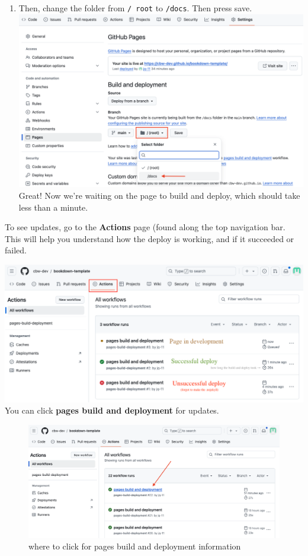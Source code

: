 \documentclass[
]{book}
\theoremstyle{definition}
\theoremstyle{definition}
\theoremstyle{definition}
\theoremstyle{definition}
\theoremstyle{remark}
\begin{document}
\begin{enumerate}
\item
  Then, change the folder from \texttt{/\ root} to \texttt{/docs}. Then press save.
  \includegraphics{img/git-instruct/github-deploy-docs.png}\\

  Great! Now we're waiting on the page to build and deploy, which should take less than a minute.
\end{enumerate}

To see updates, go to the \textbf{Actions} page (found along the top navigation bar. This will help you understand how the deploy is working, and if it succeeded or failed.

\includegraphics{img/git-instruct/github-pages-actions-explained.png}\\

You can click \textbf{pages build and deployment} for updates.

\begin{figure}
\centering
\includegraphics{img/git-instruct/pages-build-and-deployment.png}
\caption{where to click for pages build and deployment information}
\end{figure}
\end{document}
